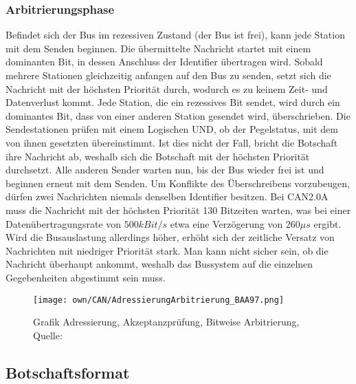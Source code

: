         \subsubsection{Arbitrierungsphase}
        Befindet sich der Bus im rezessiven Zustand (der Bus ist frei), kann jede Station mit dem Senden beginnen.
        Die übermittelte Nachricht startet mit einem dominanten Bit, in dessen Anschluss der Identifier übertragen wird.
        Sobald mehrere Stationen gleichzeitig anfangen auf den Bus zu senden, setzt sich die Nachricht mit der höchsten Priorität durch, wodurch es zu keinem Zeit- und Datenverlust kommt.
        Jede Station, die ein rezessives Bit sendet, wird durch ein dominantes Bit, dass von einer anderen Station gesendet wird, überschrieben.
        Die Sendestationen prüfen mit einem Logischen UND, ob der Pegelstatus, mit dem von ihnen gesetzten übereinstimmt.
        Ist dies nicht der Fall, bricht die Botschaft ihre Nachricht ab, weshalb sich die Botschaft mit der höchsten Priorität durchsetzt.
        Alle anderen Sender warten nun, bis der Bus wieder frei ist und beginnen erneut mit dem Senden.
        Um Konflikte des Überschreibens vorzubeugen, dürfen zwei Nachrichten niemals denselben Identifier besitzen.
        Bei CAN2.0A muss die Nachricht mit der höchsten Priorität 130 Bitzeiten warten, was bei einer Datenübertragungsrate von $500kBit/s$ etwa eine Verzögerung von $260 \mu s$ ergibt.
        Wird die Busauslastung allerdings höher, erhöht sich der zeitliche Versatz von Nachrichten mit niedriger Priorität stark.
        Man kann nicht sicher sein, ob die Nachricht überhaupt ankommt, weshalb das Bussystem auf die einzelnen Gegebenheiten abgestimmt sein muss. 
        
        \begin{figure}[!htbp]
            \centering
            \texttt{[image: own/CAN/AdressierungArbitrierung\_BAA97.png]}
            \caption{Grafik Adressierung, Akzeptanzprüfung, Bitweise Arbitrierung, Quelle: \cite{BAA2011, S.97}}
            \label{fig:AdressierungArbitrierung}
        \end{figure}


    \subsection{Botschaftsformat}
